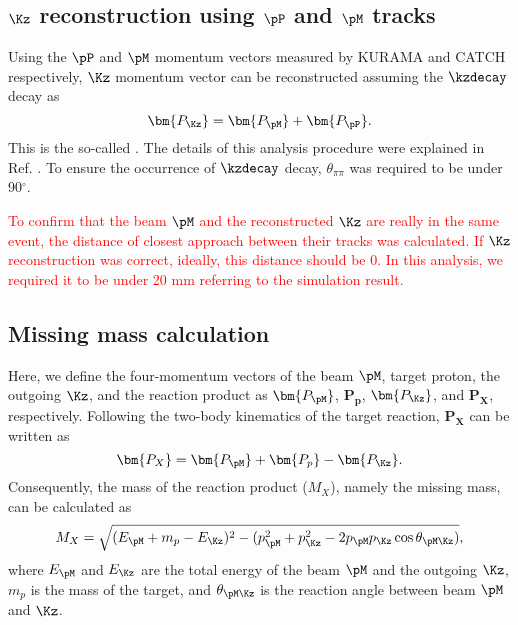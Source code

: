 \subsection{$\Kz$ reconstruction using $\pP$ and $\pM$ tracks}
Using the $\pP$ and $\pM$ momentum vectors measured by KURAMA and CATCH respectively, $\Kz$ momentum vector can be reconstructed assuming the $\kzdecay$ decay as
  \begin{equation}
    \bm{P_{\Kz}} = \bm{P_{\pM}} + \bm{P_{\pP}}.
  \end{equation}
This is the so-called . The details of this analysis procedure were explained in Ref. \cite{Tamao-JPS}. To ensure the occurrence of $\kzdecay$ decay, $\theta_{\pi\pi}$ was required to be under 90$^{\circ}$.

\textcolor{red}{ To confirm that the beam $\pM$ and the reconstructed $\Kz$ are really in the same event, the distance of closest approach between their tracks was calculated. If $\Kz$ reconstruction was correct, ideally, this distance should be 0. In this analysis, we required it to be under 20 mm referring to the simulation result. }

\subsection{Missing mass calculation}
\label{sec-mmcalc_anaflow}

Here, we define the four-momentum vectors of the beam $\pM$, target proton, the outgoing $\Kz$, and the reaction product as $\bm{P_{\pM}}$, $\bm{P_{p}}$, $\bm{P_{\Kz}}$, and $\bm{P_X}$, respectively. Following the two-body kinematics of the target reaction, $\bm{P_X}$ can be written as 
\begin{equation}
  \bm{P_X} = \bm{P_{\pM}} + \bm{P_{p}} - \bm{P_{\Kz}}. 
  \label{eq-mmom_lam}
\end{equation}
Consequently, the mass of the reaction product ($M_X$), namely the missing mass, can be calculated as
\begin{equation}
  M_X = \sqrt{ (E_{\pM} + m_p - E_{\Kz})^2 - (p_{\pM}^2 + p_{\Kz}^2 - 2p_{\pM}p_{\Kz}\cos{\theta_{\pM\Kz}}) },
  \label{eq-mm_lam}
\end{equation}
where $E_{\pM}$ and $E_{\Kz}$ are the total energy of the beam $\pM$ and the outgoing $\Kz$, $m_p$ is the mass of the target, and $\theta_{\pM\Kz}$ is the reaction angle between beam $\pM$ and $\Kz$. 

